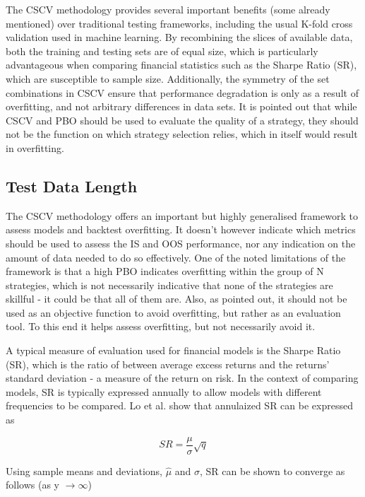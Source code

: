 \documentclass[a4paper,latin]{paper}
\begin{document}
The CSCV methodology provides several important benefits (some already mentioned) over traditional testing 
frameworks, including the usual K-fold cross validation used in machine learning. By recombining the slices of 
available data, both the training and testing sets are of equal size, which is particularly advantageous when comparing 
financial statistics such as the Sharpe Ratio (SR), which are susceptible to sample size. Additionally, the symmetry 
of the set combinations in CSCV ensure that performance degradation is only as a result of overfitting, and not 
arbitrary differences in data sets. It is pointed out that while CSCV and PBO should be used to evaluate the quality 
of a strategy, they should not be the function on which strategy selection relies, which in itself would result in overfitting.
\hfill \break 

\subsection{Test Data Length}

The CSCV methodology offers an important but highly generalised framework to assess models and backtest 
overfitting. It doesn’t however indicate which metrics should be used to assess the IS and OOS performance, nor 
any indication on the amount of data needed to do so effectively. One of the noted limitations of the framework is 
that a high PBO indicates overfitting within the group of N strategies, which is not necessarily indicative that none 
of the strategies are skillful - it could be that all of them are. Also, as pointed out, it should not be used as an 
objective function to avoid overfitting, but rather as an evaluation tool. To this end it helps assess overfitting, but 
not necessarily avoid it. 
\hfill \break 

A typical measure of evaluation used for financial models is the Sharpe Ratio (SR), which is the ratio of between 
average excess returns and the returns’ standard deviation - a measure of the return on risk. In the context of 
comparing models, SR is typically expressed annually to allow models with different frequencies to be compared. 
Lo et al. \cite{Lo} show that annulaized SR can be expressed as

\begin{equation}\label{SRAnnual}
SR=\frac{\mu}{\sigma}\sqrt{q}
\end{equation}

Using sample means and deviations, $\hat{\mu}$ and $\hat{\sigma}$, SR can be shown to converge as follows 
(as y $\rightarrow\infty$)
\end{document}
